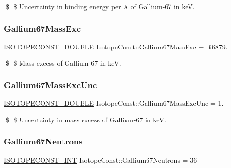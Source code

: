\$ \$ Uncertainty in binding energy per A of Gallium-\/67 in keV. \mbox{\label{group___isotope_const-_gallium-_ga67_ga5b2efac1ef3eb1c65e4b448c6829d5fa}} 
\subsubsection{\texorpdfstring{Gallium67\+Mass\+Exc}{Gallium67MassExc}}
{\footnotesize\ttfamily \mbox{\hyperlink{group___isotope_const-_macros_ga8f45a7272ce02c0b4c65c44636ed719a}{I\+S\+O\+T\+O\+P\+E\+C\+O\+N\+S\+T\+\_\+\+D\+O\+U\+B\+LE}} Isotope\+Const\+::\+Gallium67\+Mass\+Exc = -\/66879.}

\$ \$ Mass excess of Gallium-\/67 in keV. \mbox{\label{group___isotope_const-_gallium-_ga67_gabef90762e74b044afbd214b29af442c8}} 
\subsubsection{\texorpdfstring{Gallium67\+Mass\+Exc\+Unc}{Gallium67MassExcUnc}}
{\footnotesize\ttfamily \mbox{\hyperlink{group___isotope_const-_macros_ga8f45a7272ce02c0b4c65c44636ed719a}{I\+S\+O\+T\+O\+P\+E\+C\+O\+N\+S\+T\+\_\+\+D\+O\+U\+B\+LE}} Isotope\+Const\+::\+Gallium67\+Mass\+Exc\+Unc = 1.}

\$ \$ Uncertainty in mass excess of Gallium-\/67 in keV. \mbox{\label{group___isotope_const-_gallium-_ga67_ga504b400de052e663906790dff832123d}} 
\subsubsection{\texorpdfstring{Gallium67\+Neutrons}{Gallium67Neutrons}}
{\footnotesize\ttfamily \mbox{\hyperlink{group___isotope_const-_macros_ga5f18360b3e99483a35c32d789e62621c}{I\+S\+O\+T\+O\+P\+E\+C\+O\+N\+S\+T\+\_\+\+I\+NT}} Isotope\+Const\+::\+Gallium67\+Neutrons = 36}

